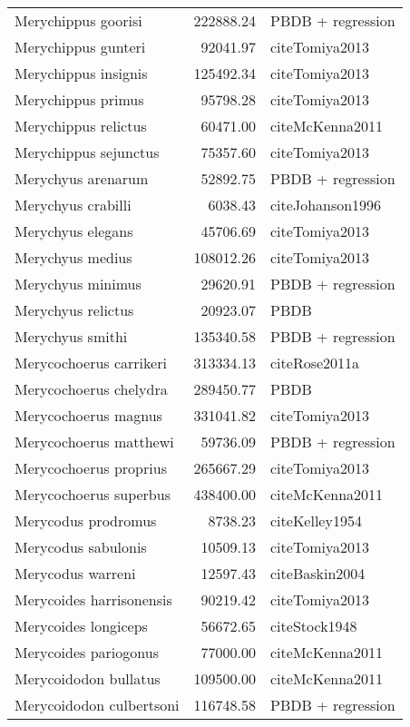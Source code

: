 \begin{table}[ht]
\begin{tabular}{lrl}
  Merychippus goorisi & 222888.24 & PBDB + regression \\ 
  Merychippus gunteri & 92041.97 & cite{Tomiya2013} \\ 
  Merychippus insignis & 125492.34 & cite{Tomiya2013} \\ 
  Merychippus primus & 95798.28 & cite{Tomiya2013} \\ 
  Merychippus relictus & 60471.00 & cite{McKenna2011} \\ 
  Merychippus sejunctus & 75357.60 & cite{Tomiya2013} \\ 
  Merychyus arenarum & 52892.75 & PBDB + regression \\ 
  Merychyus crabilli & 6038.43 & cite{Johanson1996} \\ 
  Merychyus elegans & 45706.69 & cite{Tomiya2013} \\ 
  Merychyus medius & 108012.26 & cite{Tomiya2013} \\ 
  Merychyus minimus & 29620.91 & PBDB + regression \\ 
  Merychyus relictus & 20923.07 & PBDB \\ 
  Merychyus smithi & 135340.58 & PBDB + regression \\ 
  Merycochoerus carrikeri & 313334.13 & cite{Rose2011a} \\ 
  Merycochoerus chelydra & 289450.77 & PBDB \\ 
  Merycochoerus magnus & 331041.82 & cite{Tomiya2013} \\ 
  Merycochoerus matthewi & 59736.09 & PBDB + regression \\ 
  Merycochoerus proprius & 265667.29 & cite{Tomiya2013} \\ 
  Merycochoerus superbus & 438400.00 & cite{McKenna2011} \\ 
  Merycodus prodromus & 8738.23 & cite{Kelley1954} \\ 
  Merycodus sabulonis & 10509.13 & cite{Tomiya2013} \\ 
  Merycodus warreni & 12597.43 & cite{Baskin2004} \\ 
  Merycoides harrisonensis & 90219.42 & cite{Tomiya2013} \\ 
  Merycoides longiceps & 56672.65 & cite{Stock1948} \\ 
  Merycoides pariogonus & 77000.00 & cite{McKenna2011} \\ 
  Merycoidodon bullatus & 109500.00 & cite{McKenna2011} \\ 
  Merycoidodon culbertsoni & 116748.58 & PBDB + regression \\ 

\end{tabular}
\end{table}
